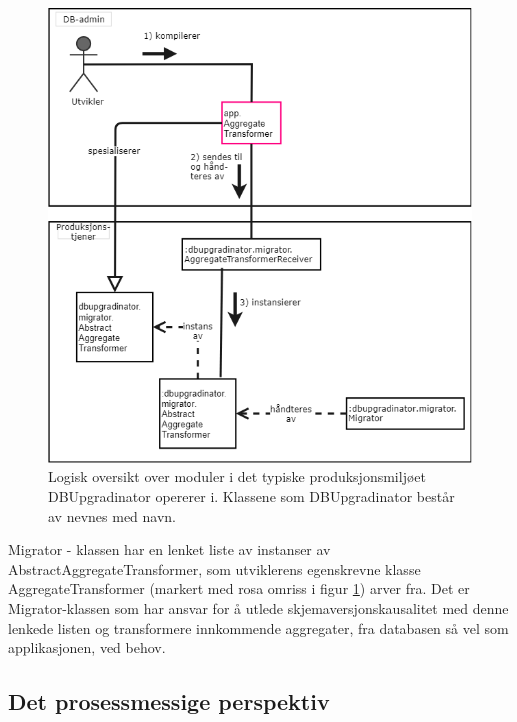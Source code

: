 \begin{figure}[!ht]
  \centering
  \includegraphics[scale=0.67]{fig/dbupgradinator-logisk-2.png}
  \caption{Logisk oversikt over moduler i det typiske produksjonsmiljøet DBUpgradinator opererer i. Klassene som DBUpgradinator består av nevnes med navn.}
  \label{fig6}
\end{figure}

Migrator - klassen har en lenket liste av instanser av AbstractAggregateTransformer, som utviklerens egenskrevne klasse AggregateTransformer (markert med rosa omriss i figur \ref{fig6}) arver fra. Det er Migrator-klassen som har ansvar for å utlede skjemaversjonskausalitet med denne lenkede listen og transformere innkommende aggregater, fra databasen så vel som applikasjonen, ved behov.

\newpage

\subsection{Det prosessmessige perspektiv}

